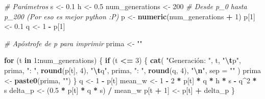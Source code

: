 \documentclass[
  11pt,
]{article}
\newenvironment{Shaded}{\begin{snugshade}}{\end{snugshade}}
\newcommand{\AttributeTok}[1]{\textcolor[rgb]{0.13,0.29,0.53}{#1}}
\newcommand{\CommentTok}[1]{\textcolor[rgb]{0.56,0.35,0.01}{\textit{#1}}}
\newcommand{\ControlFlowTok}[1]{\textcolor[rgb]{0.13,0.29,0.53}{\textbf{#1}}}
\newcommand{\DecValTok}[1]{\textcolor[rgb]{0.00,0.00,0.81}{#1}}
\newcommand{\FloatTok}[1]{\textcolor[rgb]{0.00,0.00,0.81}{#1}}
\newcommand{\FunctionTok}[1]{\textcolor[rgb]{0.13,0.29,0.53}{\textbf{#1}}}
\newcommand{\NormalTok}[1]{#1}
\newcommand{\OtherTok}[1]{\textcolor[rgb]{0.56,0.35,0.01}{#1}}
\newcommand{\SpecialCharTok}[1]{\textcolor[rgb]{0.81,0.36,0.00}{\textbf{#1}}}
\newcommand{\StringTok}[1]{\textcolor[rgb]{0.31,0.60,0.02}{#1}}
\begin{document}
\begin{Shaded}
\begin{Highlighting}[]
\CommentTok{\# Parámetros}
\NormalTok{s }\OtherTok{\textless{}{-}} \FloatTok{0.1}
\NormalTok{h }\OtherTok{\textless{}{-}} \FloatTok{0.5}
\NormalTok{num\_generations }\OtherTok{\textless{}{-}} \DecValTok{200}
\CommentTok{\# Desde p\_0 hasta p\_200 (Por eso es mejor python :P)}
\NormalTok{p }\OtherTok{\textless{}{-}} \FunctionTok{numeric}\NormalTok{(num\_generations }\SpecialCharTok{+} \DecValTok{1}\NormalTok{)}
\NormalTok{p[}\DecValTok{1}\NormalTok{] }\OtherTok{\textless{}{-}} \FloatTok{0.1}
\NormalTok{q }\OtherTok{\textless{}{-}} \DecValTok{1} \SpecialCharTok{{-}}\NormalTok{ p[}\DecValTok{1}\NormalTok{]}

\CommentTok{\# Apóstrofe de p para imprimir}
\NormalTok{prima }\OtherTok{\textless{}{-}} \StringTok{""}

\ControlFlowTok{for}\NormalTok{ (t }\ControlFlowTok{in} \DecValTok{1}\SpecialCharTok{:}\NormalTok{num\_generations) \{}
  \ControlFlowTok{if}\NormalTok{ (t }\SpecialCharTok{\textless{}=} \DecValTok{3}\NormalTok{) \{}
    \FunctionTok{cat}\NormalTok{(}
        \StringTok{"Generación: "}\NormalTok{, t, }\StringTok{"}\SpecialCharTok{\textbackslash{}t}\StringTok{p"}\NormalTok{, prima, }\StringTok{": "}\NormalTok{,}
        \FunctionTok{round}\NormalTok{(p[t], }\DecValTok{4}\NormalTok{), }\StringTok{"}\SpecialCharTok{\textbackslash{}t}\StringTok{q"}\NormalTok{, prima, }\StringTok{": "}\NormalTok{, }\FunctionTok{round}\NormalTok{(q, }\DecValTok{4}\NormalTok{), }\StringTok{"}\SpecialCharTok{\textbackslash{}n}\StringTok{"}\NormalTok{, }\AttributeTok{sep =} \StringTok{""}
\NormalTok{        )}
\NormalTok{    prima }\OtherTok{\textless{}{-}} \FunctionTok{paste0}\NormalTok{(prima, }\StringTok{"\textquotesingle{}"}\NormalTok{)}
\NormalTok{  \}}
\NormalTok{  q }\OtherTok{\textless{}{-}} \DecValTok{1} \SpecialCharTok{{-}}\NormalTok{ p[t]}
\NormalTok{  mean\_w }\OtherTok{\textless{}{-}} \DecValTok{1} \SpecialCharTok{{-}} \DecValTok{2} \SpecialCharTok{*}\NormalTok{ p[t] }\SpecialCharTok{*}\NormalTok{ q }\SpecialCharTok{*}\NormalTok{ h }\SpecialCharTok{*}\NormalTok{ s }\SpecialCharTok{{-}}\NormalTok{ q}\SpecialCharTok{\^{}}\DecValTok{2} \SpecialCharTok{*}\NormalTok{ s}
\NormalTok{  delta\_p }\OtherTok{\textless{}{-}}\NormalTok{ (}\FloatTok{0.5} \SpecialCharTok{*}\NormalTok{ p[t] }\SpecialCharTok{*}\NormalTok{ q }\SpecialCharTok{*}\NormalTok{ s) }\SpecialCharTok{/}\NormalTok{ mean\_w}
\NormalTok{  p[t }\SpecialCharTok{+} \DecValTok{1}\NormalTok{] }\OtherTok{\textless{}{-}}\NormalTok{ p[t] }\SpecialCharTok{+}\NormalTok{ delta\_p}
\NormalTok{\}}
\end{Highlighting}
\end{Shaded}
\end{document}
